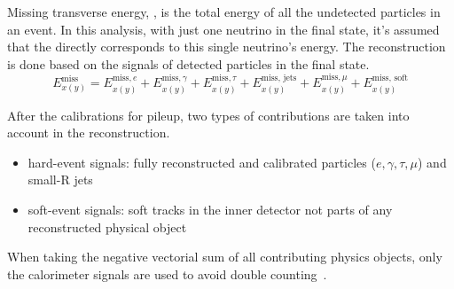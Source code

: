 \label{sec:MET_reconstruction}
Missing transverse energy, \MET , is the total energy of all the undetected particles in an event. In this analysis, with just one neutrino in the final state, it’s assumed that the \MET directly corresponds to this single neutrino’s energy. The \MET reconstruction is done based on the signals of detected particles in the final state.
\begin{equation}
\label{eq:METformula}
E_{x(y)}^{\text{miss}} = E_{x(y)}^{\text{miss}, e} + E_{x(y)}^{\text{miss}, \gamma} + E_{x(y)}^{\text{miss}, \tau} + E_{x(y)}^{\text{miss, jets}} + E_{x(y)}^{\text{miss}, \mu} + E_{x(y)}^{\text{miss, soft}}
\end{equation}

After the calibrations for pileup, two types of contributions are taken into account in the reconstruction.
        \begin{itemize}
                \item hard-event signals: fully reconstructed and calibrated particles ($e, \gamma, \tau, \mu$) and small-R jets
                \item soft-event signals: soft tracks in the inner detector not parts of any reconstructed physical object 
        \end{itemize}
When taking the negative vectorial sum of all contributing physics objects, only the calorimeter signals are used to avoid double counting~\cite{PERF-2016-07}.

